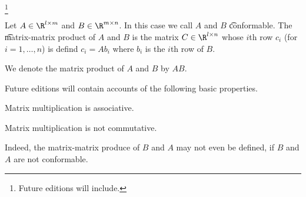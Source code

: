 
\footnote{Future editions will include.}


Let $A \in \R^{l \times m}$ and $B \in \R^{m \times n}$.
In this case we call $A$ and $B$ \t{conformable}.
The \t{matrix-matrix product} of $A$ and $B$ is the matrix $C \in \R^{l \times n}$ whose $i$th row $c_i$ (for $i = 1, \dots, n$) is defind $c_i = Ab_i$ where $b_i$ is the $i$th row of $B$.


We denote the matrix product of $A$ and $B$ by $AB$.


Future editions will contain accounts of the following basic properties.

\begin{proposition}
  Matrix multiplication is associative.
\end{proposition}

\begin{proposition}
  Matrix multiplication is not commutative.
\end{proposition}
Indeed, the matrix-matrix produce of $B$ and $A$ may not even be defined, if $B$ and $A$ are not conformable.

\blankpage

